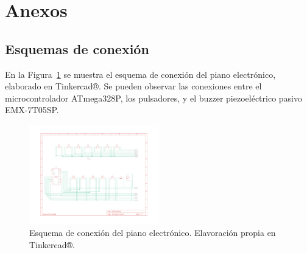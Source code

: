 \newpage

\section{Anexos}

\subsection{Esquemas de conexión}

En la Figura~\ref{fig:conexion_piano} se muestra el esquema de conexión del piano electrónico, elaborado en Tinkercad®. 
Se pueden observar las conexiones entre el microcontrolador ATmega328P, los pulsadores, y el buzzer piezoeléctrico pasivo EMX-7T05SP.

\begin{figure}[H]
    \centering
    \includegraphics[width=0.5\textwidth]{Anexos/Conexionado_de_piano.pdf}
    \caption{Esquema de conexión del piano electrónico. Elavoración propia en Tinkercad®.}
    \label{fig:conexion_piano}
\end{figure}